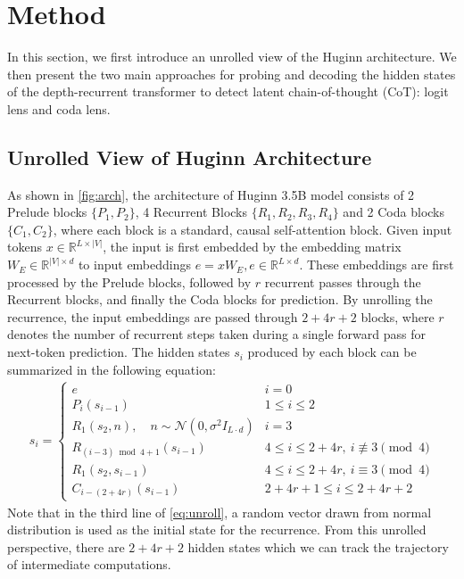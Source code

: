 \documentclass{article} %
\begin{document}
\section{Method}
In this section, we first introduce an unrolled view of the Huginn architecture. We then present the two main approaches for probing and decoding the hidden states of the depth-recurrent transformer to detect latent chain-of-thought (CoT): logit lens and coda lens.

\subsection{Unrolled View of Huginn Architecture}
As shown in \cref{fig:arch}, the architecture of Huginn 3.5B model consists of 2 Prelude blocks $\{P_1, P_2\}$, 4 Recurrent Blocks $\{R_1, R_2, R_3, R_4\}$ and 2 Coda blocks $\{C_1, C_2\}$, where each block is a standard, causal self-attention block. Given input tokens $x\in \mathbb{R}^{L\times |V|}$, the input is first embedded by the embedding matrix $W_E\in \mathbb{R}^{|V|\times d}$ to input embeddings $e = xW_{E}, e\in \mathbb{R}^{L\times d}$. These embeddings are first processed by the Prelude blocks, followed by $r$ recurrent passes through the Recurrent blocks, and finally the Coda blocks for prediction. By unrolling the recurrence, the input embeddings are passed through $2 + 4r + 2$ blocks, where $r$ denotes the number of recurrent steps taken during a single forward pass for next-token prediction. The hidden states $s_i$ produced by each block can be summarized in the following equation:
\begin{align}
s_i = 
\begin{cases}
  e & i = 0 \\
  P_i(s_{i-1}) & 1 \le i \le 2 \\
  R_1(s_2, n),\quad n \sim \mathcal{N}(0, \sigma^2 I_{L\cdot d}) & i = 3 \\
  R_{(i - 3) \bmod 4 + 1}(s_{i-1}) & 4 \le i \le 2 + 4r,\ i \not\equiv 3 \pmod{4} \\
  R_1(s_2, s_{i-1}) & 4 \le i \le 2 + 4r,\ i \equiv 3 \pmod{4} \\
  C_{i - (2 + 4r)}(s_{i-1}) & 2 + 4r + 1 \le i \le 2 + 4r + 2
\end{cases}
\label{eq:unroll}
\end{align}
Note that in the third line of \cref{eq:unroll}, a random vector drawn from normal distribution is used as the initial state for the recurrence. From this unrolled perspective, there are $2 + 4r + 2$ hidden states which we can track the trajectory of intermediate computations. 
\end{document}
